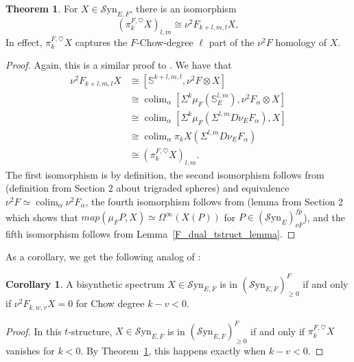 \documentclass[10pt]{amsart}
\theoremstyle{definition}
\numberwithin{figure}{section}
\numberwithin{equation}{section}
\newtheorem{theorem}[figure]{Theorem}
\newtheorem{corollary}[figure]{Corollary}
\theoremstyle{cited}
\newcommand{\bS}{\mathbb{S}}
\newcommand{\colim}{\operatorname{colim}}
\newcommand{\Syn}{\mathcal{S}\mathrm{yn}}
\begin{document}
  \begin{theorem}
  \label{F_homol_tstruct_theorem}
      For $X\in\Syn_{E,F}$, there is an isomorphism
      \[
          (\pi_k^{F,\heartsuit}X)_{l,m}\cong\nu^2F_{k+l,m,l}X,
      \]
      In effect, $\pi_k^{F,\heartsuit}X$ captures the $F$-Chow-degree $\ell$ part of the $\nu^2F$ homology of $X$.
  \end{theorem}
  
  \begin{proof}
      Again, this is a similar proof to \cite[Thm. 4.18]{Pst22}. We have that
      \begin{equation*}
       \begin{aligned}
        \nu^2F_{k+l,m,l}X&\cong [\bS^{k+l,m,l},\nu^2F\otimes X] \\
        &\cong \colim_\alpha[\Sigma^k\mu_F(\bS^{l,m}_E),\nu^2F_\alpha\otimes X] \\
        &\cong \colim_\alpha [\Sigma^k\mu_F(\Sigma^{l,m}D\nu_EF_\alpha),X] \\
        &\cong \colim_\alpha \pi_kX(\Sigma^{l,m}D\nu_EF_\alpha) \\
        &\cong (\pi_k^{F,\heartsuit}X)_{l,m}.
      \end{aligned}   
      \end{equation*}
   The first isomorphism is by definition, the second isomorphism follows from (definition from Section 2 about trigraded spheres) and equivalence $\nu^2F\simeq\colim_\alpha \nu^2F_\alpha$, the fourth isomorphism follows from (lemma from Section 2 which shows that $map(\mu_FP,X)\simeq \Omega^\infty(X(P))$ for $P\in(\Syn_E)_{\nu F}^{fp}$), and the fifth isomorphism follows from Lemma~\ref{F_dual_tstruct_lemma}.   
  \end{proof}
  
  As a corollary, we get the following analog of \cite[Cor. 4.19]{Pst22}:
  
  \begin{corollary}
  \label{F_chow_degree_cor}
  A bisynthetic spectrum $X\in\Syn_{E,F}$ is in $(\Syn_{E,F})_{\geq 0}^F$ if and only if $\nu^2F_{k,w,v}X =0$ for Chow degree $k-v<0$. 
  \end{corollary}
  
  \begin{proof}
      In this $t$-structure, $X\in\Syn_{E,F}$ is in $(\Syn_{E,F})_{\geq 0}^F$ if and only if $\pi_k^{F,\heartsuit}X$ vanishes for $k<0$. By Theorem~\ref{F_homol_tstruct_theorem}, this happens exactly when $k-v<0$.
  \end{proof}
  
\end{document}
